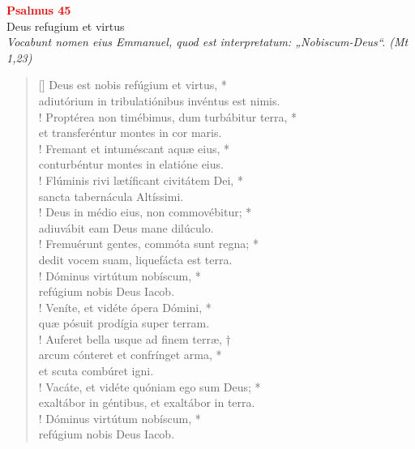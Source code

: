 


\def\greinitialformat#1{%
{\fontsize{39}{39}\selectfont #1}%
}




\vspace{0.3cm}
\begin{center}
 \textcolor{red}{\large \bf Psalmus 45}\\
Deus refugium et virtus\\
\textit{\small Vocabunt nomen eius Emmanuel, quod est interpretatum: „Nobiscum-Deus“. (Mt 1,23)}
\end{center}
\begin{verse}[\versewidth]
Deus est nobis refúgium et virtus, *\\
adiutórium in tribulatiónibus invéntus est nimis.\\!
\vin Proptérea non timébimus, dum turbábitur terra, *\\
\vin et transferéntur montes in cor maris.\\!
Fremant et intuméscant aquæ eius, *\\
conturbéntur montes in elatióne eius.\\!
\vin Flúminis rivi lætíficant civitátem Dei, *\\
\vin sancta tabernácula Altíssimi.\\!
Deus in médio eius, non commovébitur; *\\
adiuvábit eam Deus mane dilúculo.\\!
\vin Fremuérunt gentes, commóta sunt regna; *\\
\vin dedit vocem suam, liquefácta est terra.\\!
Dóminus virtútum nobíscum, *\\
refúgium nobis Deus Iacob.\\!
\vin Veníte, et vidéte ópera Dómini, *\\
\vin quæ pósuit prodígia super terram.\\!
Auferet bella usque ad finem terræ, †\\
arcum cónteret et confrínget arma, *\\
et scuta combúret igni.\\!
\vin Vacáte, et vidéte quóniam ego sum Deus; *\\
\vin exaltábor in géntibus, et exaltábor in terra.\\!
Dóminus virtútum nobíscum, *\\
refúgium nobis Deus Iacob.\\
\end{verse}
\vspace{1cm}


